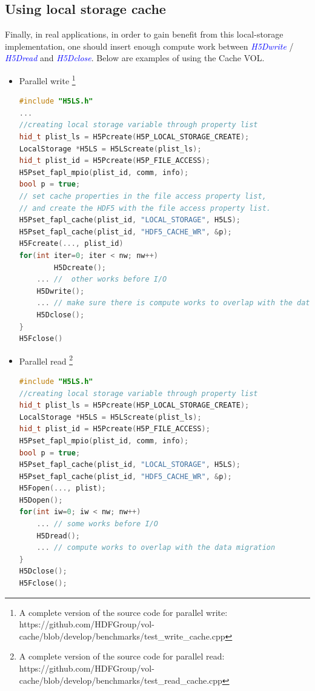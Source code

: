 \documentclass[aps, prb, 11pt, notitlepage]{revtex4-1}
\def\function#1{\textcolor{blue}{{\it #1}}}
\begin{document}
\subsection{Using local storage cache}
Finally, in real applications, in order to gain benefit from this local-storage implementation,  one should insert enough compute work between \function{H5Dwrite} /  \function{H5Dread} and \function{H5Dclose}. Below are examples of using the Cache VOL.
\begin{itemize}
\item Parallel write \footnote{A complete version of the source code for parallel write: \\https://github.com/HDFGroup/vol-cache/blob/develop/benchmarks/test\_write\_cache.cpp}
\begin{lstlisting}[language=C++]
#include "H5LS.h"
...
//creating local storage variable through property list
hid_t plist_ls = H5Pcreate(H5P_LOCAL_STORAGE_CREATE); 
LocalStorage *H5LS = H5LScreate(plist_ls);
hid_t plist_id = H5Pcreate(H5P_FILE_ACCESS);
H5Pset_fapl_mpio(plist_id, comm, info);
bool p = true;
// set cache properties in the file access property list, 
// and create the HDF5 with the file access property list.
H5Pset_fapl_cache(plist_id, "LOCAL_STORAGE", H5LS);
H5Pset_fapl_cache(plist_id, "HDF5_CACHE_WR", &p);
H5Fcreate(..., plist_id)
for(int iter=0; iter < nw; nw++)
        H5Dcreate(); 
	... //  other works before I/O
	H5Dwrite(); 
	... // make sure there is compute works to overlap with the data migration
	H5Dclose();
}
H5Fclose()
\end{lstlisting}
\item Parallel read \footnote{A complete version of the source code for parallel read: \\https://github.com/HDFGroup/vol-cache/blob/develop/benchmarks/test\_read\_cache.cpp}
\begin{lstlisting}[language=C++]
#include "H5LS.h"
//creating local storage variable through property list
hid_t plist_ls = H5Pcreate(H5P_LOCAL_STORAGE_CREATE);
LocalStorage *H5LS = H5LScreate(plist_ls);
hid_t plist_id = H5Pcreate(H5P_FILE_ACCESS);
H5Pset_fapl_mpio(plist_id, comm, info);
bool p = true;
H5Pset_fapl_cache(plist_id, "LOCAL_STORAGE", H5LS);
H5Pset_fapl_cache(plist_id, "HDF5_CACHE_WR", &p);
H5Fopen(..., plist);
H5Dopen();
for(int iw=0; iw < nw; nw++)
	... // some works before I/O
	H5Dread();
	... // compute works to overlap with the data migration
}
H5Dclose();
H5Fclose();
\end{lstlisting}
\end{itemize}
\end{document}
